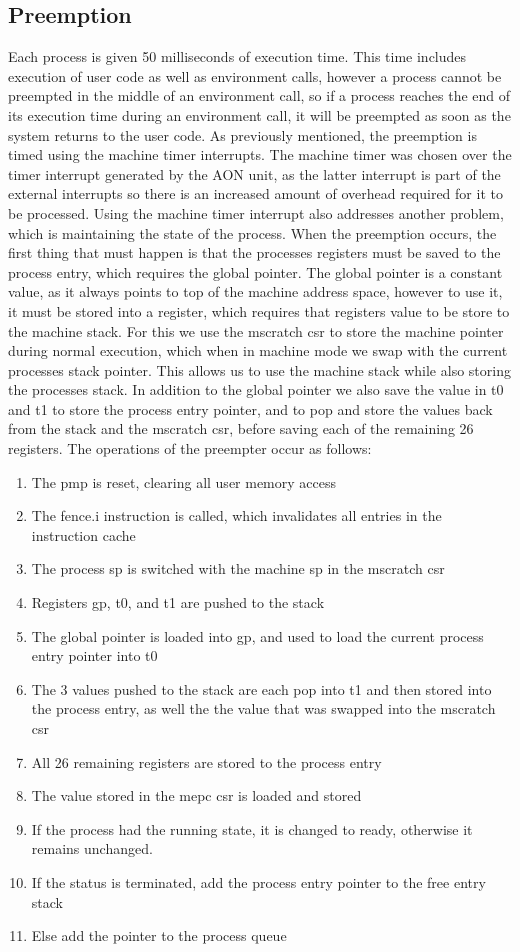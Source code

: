 \subsection{Preemption}
Each process is given 50 milliseconds of execution time. This time includes execution of user code as well as environment calls, however a process cannot be preempted in the middle of an environment call, so if a process reaches the end of its execution time during an environment call, it will be preempted as soon as the system returns to the user code. As previously mentioned, the preemption is timed using the machine timer interrupts. The machine timer was chosen over the timer interrupt generated by the AON unit, as the latter interrupt is part of the external interrupts so there is an increased amount of overhead required for it to be processed. Using the machine timer interrupt also addresses another problem, which is maintaining the state of the process. When the preemption occurs, the first thing that must happen is that the processes registers must be saved to the process entry, which requires the global pointer. The global pointer is a constant value, as it always points to top of the machine address space, however to use it, it must be stored into a register, which requires that registers value to be store to the machine stack. For this we use the mscratch csr to store the machine pointer during normal execution, which when in machine mode we swap with the current processes stack pointer. This allows us to use the machine stack while also storing the processes stack. In addition to the global pointer we also save the value in t0 and t1 to store the process entry pointer, and to pop and store the values back from the stack and the mscratch csr, before saving each of the remaining 26 registers. The operations of the preempter occur as follows:
\begin{enumerate}
    \item The \ac{pmp} is reset, clearing all user memory access
    \item The fence.i instruction is called, which invalidates all entries in the instruction cache
    \item The process sp is switched with the machine sp in the mscratch csr
    \item Registers gp, t0, and t1 are pushed to the stack
    \item The global pointer is loaded into gp, and used to load the current process entry pointer into t0
    \item The 3 values pushed to the stack are each pop into t1 and then stored into the process entry, as well the the value that was swapped into the mscratch csr
    \item All 26 remaining registers are stored to the process entry
    \item The value stored in the mepc csr is loaded and stored
    \item If the process had the running state, it is changed to ready, otherwise it remains unchanged.
    \item If the status is terminated, add the process entry pointer to the free entry stack
    \item Else add the pointer to the process queue
\end{enumerate}
